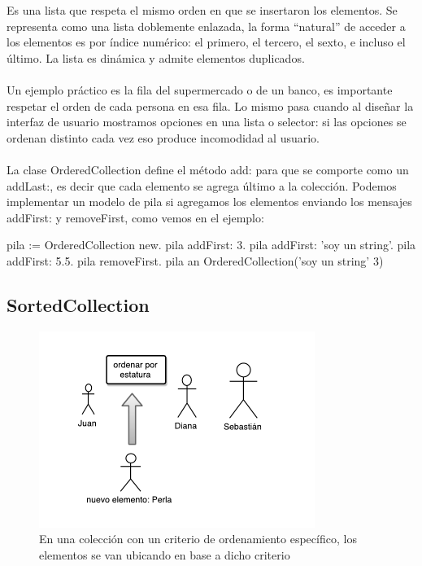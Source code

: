 \documentclass[a4paper,12pt]{book}
\begin{document}
Es una lista que respeta el mismo orden en que se insertaron los elementos. Se representa como una lista
doblemente enlazada, la forma ``natural'' de acceder a los elementos es por índice numérico: el primero, 
el tercero, el sexto, e incluso el último. La lista es dinámica y admite elementos duplicados. 
\\
\\
Un ejemplo práctico es la fila del supermercado o de un banco, es importante respetar el orden de cada
persona en esa fila. Lo mismo pasa cuando al diseñar la interfaz de usuario mostramos opciones en una
lista o selector: si las opciones se ordenan distinto cada vez eso produce incomodidad al usuario.
\\
\\
La clase OrderedCollection define el método add: para que se comporte como un addLast:, es decir que cada
elemento se agrega último a la colección. Podemos implementar un modelo de pila si agregamos los elementos
enviando los mensajes addFirst: y removeFirst, como vemos en el ejemplo:

\begin{code}
pila := OrderedCollection new.
pila addFirst: 3.
pila addFirst: 'soy un string'.
pila addFirst: 5.5.
pila removeFirst.
pila
  an OrderedCollection('soy un string' 3)
\end{code}


\subsection{SortedCollection}

\begin{figure}[h!]
    \centering
    \includegraphics[width=0.8\textwidth]{images/40_SortedCollection.pdf}
    \caption{En una colección con un criterio de ordenamiento específico, los elementos se van ubicando en base a dicho criterio}
\end{figure}
\FloatBarrier
\end{document}
